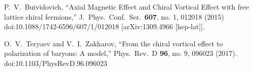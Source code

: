 \documentclass[preprint,aps,showpacs,nofootinbib,superscriptaddress,preprintnumbers,epsf,psf]{revtex4}
\begin{document}
\begin{thebibliography}{99}
  P.~V.~Buividovich,
  ``Axial Magnetic Effect and Chiral Vortical Effect with free lattice chiral fermions,''
  J.\ Phys.\ Conf.\ Ser.\  {\bf 607}, no. 1, 012018 (2015)
  doi:10.1088/1742-6596/607/1/012018
  [arXiv:1309.4966 [hep-lat]].

 O.~V.~Teryaev and V.~I.~Zakharov,
 ``From the chiral vortical effect to polarization of baryons: A model,''
  Phys.\ Rev.\ D {\bf 96}, no. 9, 096023 (2017).
  doi:10.1103/PhysRevD.96.096023













\end{thebibliography}
\end{document}
